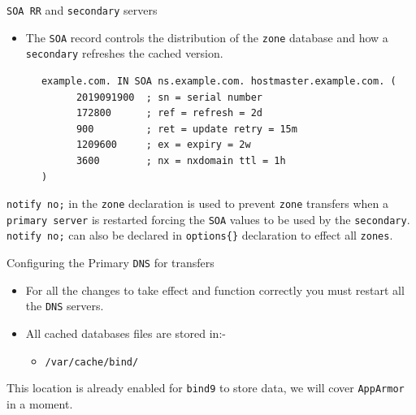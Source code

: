 \documentclass[xcolor=table]{beamer}
\begin{document}
\begin{frame}[fragile]{\texttt{SOA RR} and \texttt{secondary} servers}
  \begin{itemize}
    \item The \texttt{SOA} record controls the distribution of the \texttt{zone} database and how a \texttt{secondary} refreshes the cached version.
  \end{itemize}
  \begin{tcolorbox}
    \lstset{
      basicstyle=\tiny\ttfamily,
    }
    \begin{lstlisting}
      example.com. IN SOA ns.example.com. hostmaster.example.com. ( 
	        2019091900  ; sn = serial number 
	        172800      ; ref = refresh = 2d 
	        900         ; ret = update retry = 15m 
	        1209600     ; ex = expiry = 2w 
	        3600        ; nx = nxdomain ttl = 1h 
      ) 
    \end{lstlisting}
  \end{tcolorbox}
  \begin{tcolorbox}[title={\textbf{PERFORMANCE:}}]
    \scriptsize \texttt{notify no;} in the \texttt{zone} declaration is used to prevent \texttt{zone} transfers when a \texttt{primary server} is restarted forcing the \texttt{SOA} values to be used by the \texttt{secondary}.\\
    \scriptsize \texttt{notify no;} can also be declared in \texttt{options\{\}} declaration to effect all \texttt{zones}.    
  \end{tcolorbox}
\end{frame}

\begin{frame}{Configuring the Primary \texttt{DNS} for transfers}
  \begin{itemize}
    \item For all the changes to take effect and function correctly you must restart all the \texttt{DNS} servers.
    \item All cached databases files are stored in:-
      \begin{itemize}
        \item \texttt{/var/cache/bind/}
      \end{itemize}
  \end{itemize}
  \begin{tcolorbox}[title={\textbf{NOTE:}}]
    This location is already enabled for \texttt{bind9} to store data, we will cover \texttt{AppArmor} in a moment.
  \end{tcolorbox}
\end{frame}
\end{document}
